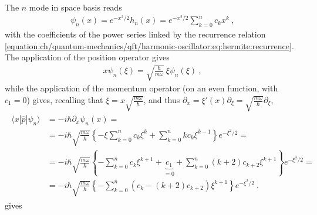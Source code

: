 \documentclass[letterpaper,10pt,english]{jupyterBook}
\begin{document}
\sphinxAtStartPar
The \(n\) mode in space basis reads
\begin{equation*}
\begin{split}\psi_n(x) = e^{-x^2/2} h_n(x) = e^{-x^2/2} \sum_{k=0}^{n} c_k x^k \ ,\end{split}
\end{equation*}
\sphinxAtStartPar
with the coefficients of the power series linked by the recurrence relation \eqref{equation:ch/quantum-mechanics/qft/harmonic-oscillator:eq:hermite:recurrence}. The application of the position operator gives
\begin{equation*}
\begin{split}x \psi_n(\xi) = \sqrt{\frac{\hbar}{m \omega}} \, \xi \psi_n(\xi) \ ,\end{split}
\end{equation*}
\sphinxAtStartPar
while the application of the momentum operator (on an even function, with \(c_1 = 0\)) gives, recalling that \(\xi = x \sqrt{\tfrac{m \omega}{\hbar}}\), and thus \(\partial_x = \xi'(x) \partial_\xi = \sqrt{\tfrac{m\omega}{\hbar}} \partial_{\xi}\),
\begin{equation*}
\begin{split}\begin{aligned}
  \langle x | \hat{p} | \psi_n \rangle 
  & = - i \hbar \partial_x \psi_n(x) = \\
  & = - i \hbar \sqrt{\frac{m \omega}{\hbar}} \left\{ -\xi \sum_{k=0}^{n} c_k \xi^k + \sum_{k=0}^{n} k c_k \xi^{k-1} \right\} e^{-\xi^2/2} = \\
  & = - i \hbar \sqrt{\frac{m \omega}{\hbar}} \left\{ - \sum_{k=0}^{n} c_k \xi^{k+1} + \underbrace{c_1}_{=0} + \sum_{k=0}^{n} ( k + 2) c_{k+2} \xi^{k+1} \right\} e^{-\xi^2/2} = \\
  & = - i \hbar \sqrt{\frac{m \omega}{\hbar}} \left\{ - \sum_{k=0}^{n} \left( c_k - (k+2) c_{k+2} \right) \xi^{k+1} \right\} e^{-\xi^2/2} \ .
\end{aligned}\end{split}
\end{equation*}
\sphinxAtStartPar
{} gives
\end{document}
